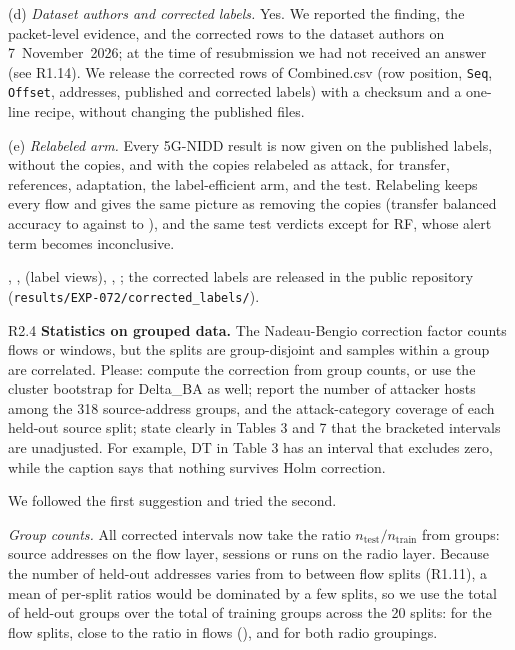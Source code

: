(d) \emph{Dataset authors and corrected labels.} Yes. We reported the finding, the packet-level evidence, and the corrected rows to the dataset authors on 7~November~2026; at the time of resubmission we had not received an answer (see R1.14). We release the \RCopies{} corrected rows of Combined.csv (row position, \texttt{Seq}, \texttt{Offset}, addresses, published and corrected labels) with a checksum and a one-line recipe, without changing the published files.

(e) \emph{Relabeled arm.} Every 5G-NIDD result is now given on the published labels, without the copies, and with the copies relabeled as attack, for transfer, references, adaptation, the label-efficient arm, and the test. Relabeling keeps every flow and gives the same picture as removing the copies (transfer balanced accuracy \RTrRelabBAmin{} to \RTrRelabBAmax{} against \RTrCleanBAmin{} to \RTrCleanBAmax), and the same test verdicts except for RF, whose alert term becomes inconclusive.

\action {}, ,  (label views), , ; the corrected labels are released in the public repository (\texttt{results/EXP-072/corrected\_labels/}).



\label{rv:R2.4}
\begin{concern}{R2.4}
\textbf{Statistics on grouped data.} The Nadeau-Bengio correction factor counts flows or windows, but the splits are group-disjoint and samples within a group are correlated. Please: compute the correction from group counts, or use the cluster bootstrap for Delta\_BA as well; report the number of attacker hosts among the 318 source-address groups, and the attack-category coverage of each held-out source split; state clearly in Tables 3 and 7 that the bracketed intervals are unadjusted. For example, DT in Table 3 has an interval that excludes zero, while the caption says that nothing survives Holm correction.
\end{concern}
\response We followed the first suggestion and tried the second.

\emph{Group counts.} All corrected intervals now take the ratio $n_{\mathrm{test}}/n_{\mathrm{train}}$ from groups: source addresses on the flow layer, sessions or runs on the radio layer. Because the number of held-out addresses varies from \RCovTestGroupsMin{} to \RCovTestGroupsMax{} between flow splits (R1.11), a mean of per-split ratios would be dominated by a few splits, so we use the total of held-out groups over the total of training groups across the 20 splits: \RNbRatioGroups{} for the flow splits, close to the ratio in flows (\RNbRatioFlows), and \RRadRatioSess{} for both radio groupings.

